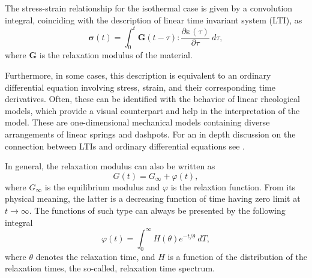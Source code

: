 The stress-strain relationship for the isothermal case is given by a convolution integral, coinciding with the description of linear time invariant system (LTI), as
\begin{equation}
\label{eq:stress_constitutive_infinitesimal_viscoelasticity}
	\bm \sigma(t) = \int_0^t \mathbf G(t-\tau):\frac{\partial \bm \varepsilon(\tau)}{\partial \tau}\ d\tau,
\end{equation}
where $\mathbf{G}$ is the relaxation modulus of the material.

Furthermore, in some cases, this description is equivalent to an ordinary differential equation involving stress, strain, and their corresponding time derivatives.
Often, these can be identified with the behavior of linear rheological models, which provide a visual counterpart and help in the interpretation of the model.
These are one-dimensional mechanical models containing diverse arrangements of linear springs and dashpots.
For an in depth discussion on the connection between LTIs and ordinary differential equations see \cite{ciampaLinearDifferentialEquations2019}.

In general, the relaxation modulus can also be written as \citep{malkinRheologyConceptsMethods2017}
\begin{equation}
\label{eq:relax_mod_decomp}
	G(t) = G_\infty + \varphi(t),
\end{equation}
where $G_\infty$ is the equilibrium modulus and $\varphi$ is the relaxtion function.
From its physical meaning, the latter is a decreasing function of time having zero limit at $t\to\infty$.
The functions of such type can always be presented by the following integral
\begin{equation}
  \label{eq:relax_time_spectrum}
	\varphi(t) = \int_0^\infty H(\theta) e^{-t/\theta}\ dT,
\end{equation}
where $\theta$ denotes the relaxation time, and $H$ is a function of the distribution of the relaxation times, the so-called, relaxation time spectrum.

